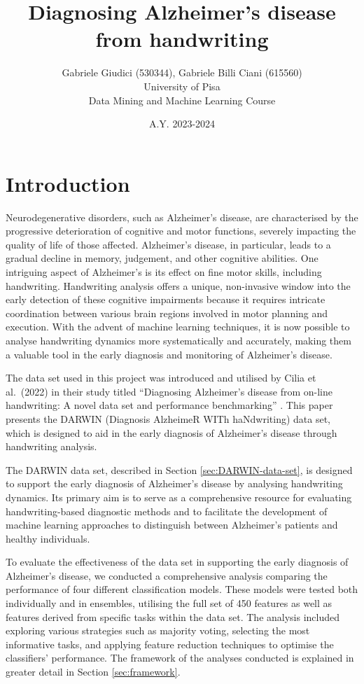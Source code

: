 \documentclass[a4paper, 11pt]{article}
\title{Diagnosing Alzheimer’s disease from handwriting}
\author{Gabriele Giudici (530344), Gabriele Billi Ciani (615560)\\University of Pisa\\ Data Mining and Machine Learning Course}
\date{A.Y. 2023-2024}
\begin{document}
\maketitle

\tableofcontents

\section{Introduction}

Neurodegenerative disorders, such as Alzheimer's disease, are characterised by the progressive deterioration of cognitive and motor functions, severely impacting the quality of life of those affected. Alzheimer's disease, in particular, leads to a gradual decline in memory, judgement, and other cognitive abilities. One intriguing aspect of Alzheimer's is its effect on fine motor skills, including handwriting. Handwriting analysis offers a unique, non-invasive window into the early detection of these cognitive impairments because it requires intricate coordination between various brain regions involved in motor planning and execution. With the advent of machine learning techniques, it is now possible to analyse handwriting dynamics more systematically and accurately, making them a valuable tool in the early diagnosis and monitoring of Alzheimer's disease.

The data set used in this project was introduced and utilised by Cilia et al.~(2022) in their study titled ``Diagnosing Alzheimer’s disease from on-line handwriting: A novel data set and performance benchmarking'' \cite{Cilia2022}. This paper presents the DARWIN (Diagnosis AlzheimeR WITh haNdwriting) data set, which is designed to aid in the early diagnosis of Alzheimer’s disease through handwriting analysis.

The DARWIN data set, described in Section \ref{sec:DARWIN-data-set}, is designed to support the early diagnosis of Alzheimer's disease by analysing handwriting dynamics. Its primary aim is to serve as a comprehensive resource for evaluating handwriting-based diagnostic methods and to facilitate the development of machine learning approaches to distinguish between Alzheimer's patients and healthy individuals.

To evaluate the effectiveness of the data set in supporting the early diagnosis of Alzheimer's disease, we conducted a comprehensive analysis comparing the performance of four different classification models. These models were tested both individually and in ensembles, utilising the full set of 450 features as well as features derived from specific tasks within the data set. The analysis included exploring various strategies such as majority voting, selecting the most informative tasks, and applying feature reduction techniques to optimise the classifiers' performance. The framework of the analyses conducted is explained in greater detail in Section \ref{sec:framework}.
\end{document}
